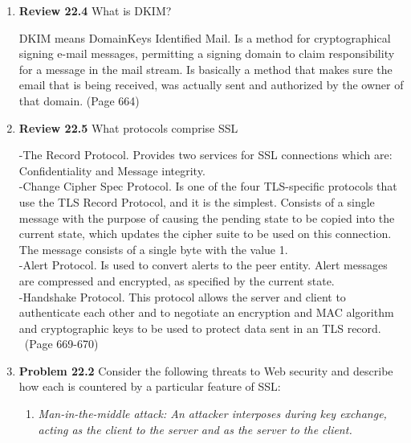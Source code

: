 \documentclass[12pt]{article}
\begin{document}
\renewcommand{\headrulewidth}{0.4pt}

\vspace{-3mm}

\begin{enumerate}

	\item {\textbf{Review 22.4}  What is DKIM?}
	 
	DKIM means DomainKeys Identified Mail. Is a  method for cryptographical signing e-mail messages, permitting a signing domain to claim responsibility for a message in the mail stream. Is basically a method that makes sure the email that is being received, was actually sent and authorized by the owner of that domain. 
	(Page 664)	
	\vspace{10pt}

	\item {\textbf{Review 22.5} What protocols comprise SSL} 
	
	-The Record Protocol. Provides two services for SSL connections which are: Confidentiality and Message integrity.  \\
	-Change Cipher Spec Protocol. Is one of the four TLS-specific protocols that use the TLS Record Protocol, and it is the simplest. Consists of a single message with the purpose of causing the pending state to be copied into the current state, which updates the cipher suite to be used on this connection. The message consists of a single byte with the value 1. \\
	-Alert Protocol. Is used to convert alerts to the peer entity. Alert messages are compressed and encrypted, as specified by the current state. \\
	-Handshake Protocol. This protocol allows the server and client to authenticate each other and to negotiate an encryption and MAC algorithm and cryptographic keys to be used to protect data sent in an TLS record. \
	(Page 669-670)
	\vspace{10pt}
	
	\item {\textbf{Problem 22.2} Consider the following threats to Web security and describe how each is countered by a particular feature of SSL: }
	
\begin{enumerate}
\item \textit{Man-in-the-middle attack: An attacker interposes during key exchange, acting as the client to the server and as the server to the client.}


\end{enumerate}
\end{enumerate}
\end{document}
